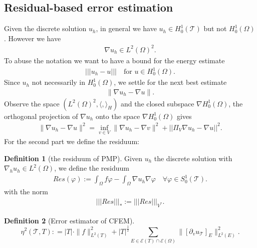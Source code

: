 \documentclass[a4paper,12pt,oneside,fleqn]{book}
\theoremstyle{definition}
\newtheorem{definition}{Definition}[section]
\theoremstyle{remark}
\begin{document}
\subsection{Residual-based error estimation}
Given  the discrete solution $u_h$, in general we have $u_h \in H^1_0(\mathcal{T})$ but not $H_0^1(\Omega)$. However we have
\begin{align*}
	\nabla u_h \in L^2(\Omega)^2. 
\end{align*}
To abuse the notation we want to have a bound for the energy estimate 
\begin{align*}
	|||u_h - u ||| \quad \text{for } u \in H_0^1(\Omega). 
\end{align*}
Since $u_h$ not necessarily in $H_0^1(\Omega)$, we settle for the next best estimate 
\begin{align*}
	\|\nabla u_h - \nabla u \|. 
\end{align*}
Observe the space $ ( L^2(\Omega)^2, \langle, \rangle_H)$ and the closed subspace $\nabla H_0^1(\Omega)$,  the orthogonal projection of $\nabla u_h$ onto the space $\nabla H_0^1(\Omega)$ gives
\begin{align*}
	\|\nabla u_h - \nabla u\|^2 = \inf_{v \in V} \|\nabla u_h - \nabla v\|^2 +  || \Pi_V \nabla u_h - \nabla u ||^2.
\end{align*}
For the second part we define the residuum:
\begin{definition}[the residuum of PMP]
	Given $u_h$ the discrete solution with $\nabla_h u_h \in L^2(\Omega)$, we define the residuum 
	\begin{align*}
		Res(\varphi):= \int_\Omega f \varphi - \int_\Omega \nabla u_h \nabla \varphi \quad \forall \varphi \in S_0^1(\mathcal{T}). 
	\end{align*}
	with the norm
	\begin{align*}
		|||Res|||_*:= |||Res|||_{V^*}.
	\end{align*}
\end{definition} 





  

\begin{definition}[Error estimator of CFEM]
\begin{equation}
	\eta^2(\mathcal{T}, T): = |T| \cdot \|f\|_{L^2(T)}^2 + |T|^{\frac{1}{2}} \sum_{E \in \mathcal{E}(T) \cap \mathcal{E}(\Omega)} \|[\partial_v u_\mathcal{T} ]_E \|_{L^2(E)}^2. 
\end{equation}
\end{definition}
\end{document}
